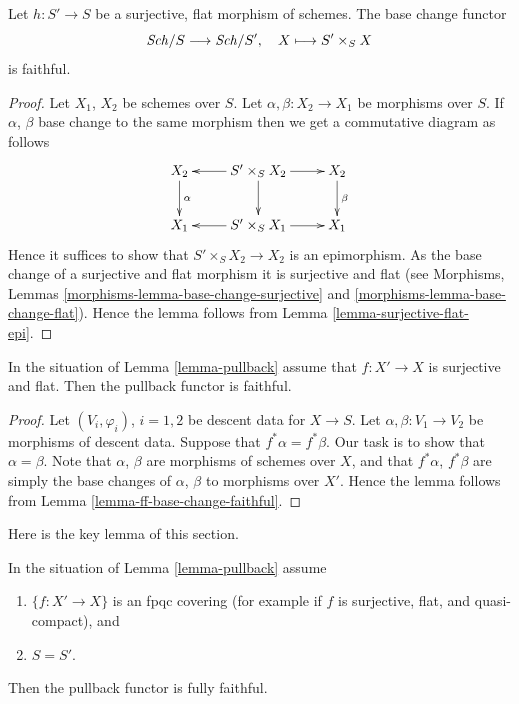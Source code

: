 \begin{lemma}
\label{lemma-ff-base-change-faithful}
Let $h : S' \to S$ be a surjective, flat morphism of
schemes. The base change functor
$$
\mathit{Sch}/S \longrightarrow \mathit{Sch}/S', \quad
X \longmapsto S' \times_S X
$$
is faithful.
\end{lemma}

\begin{proof}
Let $X_1$, $X_2$ be schemes over $S$.
Let $\alpha, \beta : X_2 \to X_1$ be morphisms over $S$.
If $\alpha$, $\beta$ base change to the same morphism then
we get a commutative diagram as follows
$$
\xymatrix{
X_2 \ar[d]^\alpha &
S' \times_S X_2 \ar[l] \ar[d] \ar[r] &
X_2 \ar[d]^\beta \\
X_1 &
S' \times_S X_1 \ar[l] \ar[r] &
X_1
}
$$
Hence it suffices to show that $S' \times_S X_2 \to X_2$
is an epimorphism. As the base change of a surjective and
flat morphism it is surjective and flat (see
Morphisms, Lemmas \ref{morphisms-lemma-base-change-surjective}
and \ref{morphisms-lemma-base-change-flat}). Hence the lemma follows
from Lemma \ref{lemma-surjective-flat-epi}.
\end{proof}

\begin{lemma}
\label{lemma-faithful}
In the situation of Lemma \ref{lemma-pullback}
assume that $f : X' \to X$ is surjective
and flat. Then the pullback functor is faithful.
\end{lemma}

\begin{proof}
Let $(V_i, \varphi_i)$, $i = 1, 2$ be descent data for $X \to S$.
Let $\alpha, \beta : V_1 \to V_2$ be morphisms of descent data.
Suppose that $f^*\alpha = f^*\beta$. Our task is to show that
$\alpha = \beta$. Note that $\alpha$, $\beta$ are morphisms
of schemes over $X$, and that $f^*\alpha$, $f^*\beta$ are
simply the base changes of $\alpha$, $\beta$ to morphisms over
$X'$. Hence the lemma follows from Lemma \ref{lemma-ff-base-change-faithful}.
\end{proof}

\noindent
Here is the key lemma of this section.

\begin{lemma}
\label{lemma-fully-faithful}
In the situation of Lemma \ref{lemma-pullback}
assume
\begin{enumerate}
\item $\{f : X' \to X\}$ is an fpqc covering (for example if $f$ is
surjective, flat, and quasi-compact), and
\item $S = S'$.
\end{enumerate}
Then the pullback functor is fully faithful.
\end{lemma}

